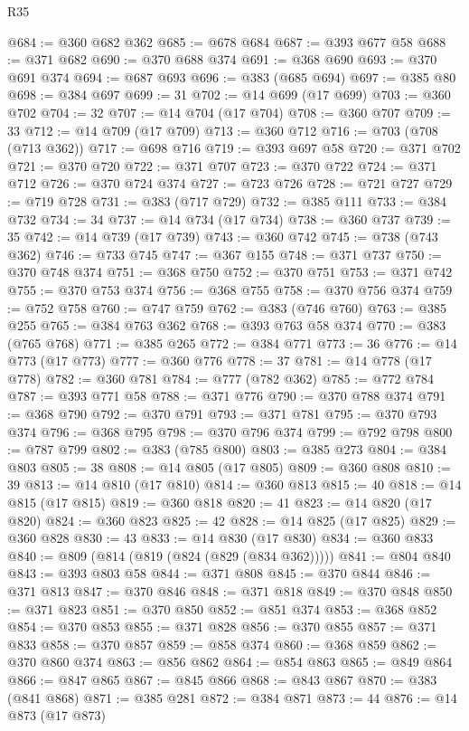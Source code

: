 \begin{lexlean}{R35}
\begin{coremodule}
{{{{{{{{{{{{{{{{{{{{{{{{{{{{{{{{{{{{{{{{{{{{{{{{{{{{@684 := @360 @682 @362
@685 := @678 @684
@687 := @393 @677 @58
@688 := @371 @682
@690 := @370 @688 @374
@691 := @368 @690
@693 := @370 @691 @374
@694 := @687 @693
@696 := @383 (@685 @694)
@697 := @385 @80
@698 := @384 @697
@699 := 31
@702 := @14 @699 (@17 @699)
@703 := @360 @702
@704 := 32
@707 := @14 @704 (@17 @704)
@708 := @360 @707
@709 := 33
@712 := @14 @709 (@17 @709)
@713 := @360 @712
@716 := @703 (@708 (@713 @362))
@717 := @698 @716
@719 := @393 @697 @58
@720 := @371 @702
@721 := @370 @720
@722 := @371 @707
@723 := @370 @722
@724 := @371 @712
@726 := @370 @724 @374
@727 := @723 @726
@728 := @721 @727
@729 := @719 @728
@731 := @383 (@717 @729)
@732 := @385 @111
@733 := @384 @732
@734 := 34
@737 := @14 @734 (@17 @734)
@738 := @360 @737
@739 := 35
@742 := @14 @739 (@17 @739)
@743 := @360 @742
@745 := @738 (@743 @362)
@746 := @733 @745
@747 := @367 @155
@748 := @371 @737
@750 := @370 @748 @374
@751 := @368 @750
@752 := @370 @751
@753 := @371 @742
@755 := @370 @753 @374
@756 := @368 @755
@758 := @370 @756 @374
@759 := @752 @758
@760 := @747 @759
@762 := @383 (@746 @760)
@763 := @385 @255
@765 := @384 @763 @362
@768 := @393 @763 @58 @374
@770 := @383 (@765 @768)
@771 := @385 @265
@772 := @384 @771
@773 := 36
@776 := @14 @773 (@17 @773)
@777 := @360 @776
@778 := 37
@781 := @14 @778 (@17 @778)
@782 := @360 @781
@784 := @777 (@782 @362)
@785 := @772 @784
@787 := @393 @771 @58
@788 := @371 @776
@790 := @370 @788 @374
@791 := @368 @790
@792 := @370 @791
@793 := @371 @781
@795 := @370 @793 @374
@796 := @368 @795
@798 := @370 @796 @374
@799 := @792 @798
@800 := @787 @799
@802 := @383 (@785 @800)
@803 := @385 @273
@804 := @384 @803
@805 := 38
@808 := @14 @805 (@17 @805)
@809 := @360 @808
@810 := 39
@813 := @14 @810 (@17 @810)
@814 := @360 @813
@815 := 40
@818 := @14 @815 (@17 @815)
@819 := @360 @818
@820 := 41
@823 := @14 @820 (@17 @820)
@824 := @360 @823
@825 := 42
@828 := @14 @825 (@17 @825)
@829 := @360 @828
@830 := 43
@833 := @14 @830 (@17 @830)
@834 := @360 @833
@840 := @809 (@814 (@819 (@824 (@829 (@834 @362)))))
@841 := @804 @840
@843 := @393 @803 @58
@844 := @371 @808
@845 := @370 @844
@846 := @371 @813
@847 := @370 @846
@848 := @371 @818
@849 := @370 @848
@850 := @371 @823
@851 := @370 @850
@852 := @851 @374
@853 := @368 @852
@854 := @370 @853
@855 := @371 @828
@856 := @370 @855
@857 := @371 @833
@858 := @370 @857
@859 := @858 @374
@860 := @368 @859
@862 := @370 @860 @374
@863 := @856 @862
@864 := @854 @863
@865 := @849 @864
@866 := @847 @865
@867 := @845 @866
@868 := @843 @867
@870 := @383 (@841 @868)
@871 := @385 @281
@872 := @384 @871
@873 := 44
@876 := @14 @873 (@17 @873)
}}}}}}}}}}}}}}}}}}}}}}}}}}}}}}}}}}}}}}}}}}}}}}}}}}}}
\end{coremodule}
\end{lexlean}
